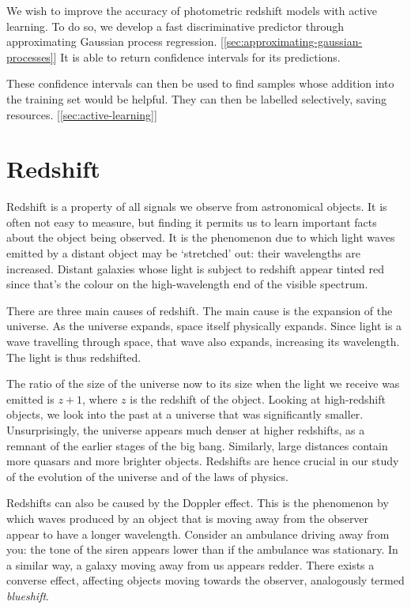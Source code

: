 \documentclass[11pt,twoside,openright]{report}
\begin{document}
We wish to improve the accuracy of photometric redshift models with active learning. To do so, we develop a fast discriminative predictor through approximating Gaussian process regression. [\cref{sec:approximating-gaussian-processes}] It is able to return confidence intervals for its predictions.

These confidence intervals can then be used to find samples whose addition into the training set would be helpful. They can then be labelled selectively, saving resources. [\cref{sec:active-learning}]

\section{Redshift}
  Redshift is a property of all signals we observe from astronomical objects. It is often not easy to measure, but finding it permits us to learn important facts about the object being observed. It is the phenomenon due to which light waves emitted by a distant object may be `stretched' out: their wavelengths are increased. Distant galaxies whose light is subject to redshift appear tinted red since that's the colour on the high-wavelength end of the visible spectrum.

  There are three main causes of redshift. The main cause is the expansion of the universe. As the universe expands, space itself physically expands. Since light is a wave travelling through space, that wave also expands, increasing its wavelength. The light is thus redshifted.

  The ratio of the size of the universe now to its size when the light we receive was emitted is $z + 1$, where $z$ is the redshift of the object. Looking at high-redshift objects, we look into the past at a universe that was significantly smaller. Unsurprisingly, the universe appears much denser at higher redshifts, as a remnant of the earlier stages of the big bang. Similarly, large distances contain more quasars and more brighter objects. Redshifts are hence crucial in our study of the evolution of the universe and of the laws of physics.

  Redshifts can also be caused by the Doppler effect. This is the phenomenon by which waves produced by an object that is moving away from the observer appear to have a longer wavelength. Consider an ambulance driving away from you: the tone of the siren appears lower than if the ambulance was stationary. In a similar way, a galaxy moving away from us appears redder. There exists a converse effect, affecting objects moving towards the observer, analogously termed \emph{blueshift}.
\end{document}
